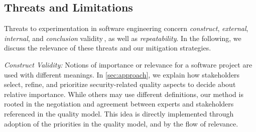 \subsection{Threats and Limitations}
\label{sec:threats}

Threats to experimentation in software engineering %
concern
\emph{construct}, \emph{external}, \emph{internal}, and \emph{conclusion} validity\,\cite{Jedlitschka2008RES}, as well as \emph{repeatability}.
In the following, we discuss the relevance of these threats and our mitigation strategies.

\textit{Construct Validity:}
%
Notions of importance or relevance for a software project are used with different meanings. %
In \autoref{sec:approach}, we explain %
how stakeholders select, refine, and prioritize security-related quality aspects to decide about relative importance.
While others may use different definitions, our method is rooted in the negotiation and agreement between experts and stakeholders %
referenced in the quality model.
This idea is %
directly implemented through adoption of the priorities in the quality model, and by the flow of relevance.


